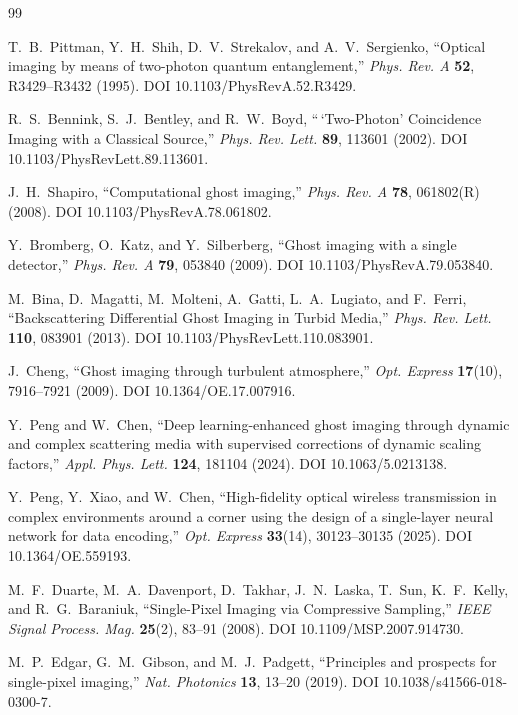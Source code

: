 \begin{thebibliography}{99}

T.~B.~Pittman, Y.~H.~Shih, D.~V.~Strekalov, and A.~V.~Sergienko, ``Optical imaging by means of two-photon quantum entanglement,'' \emph{Phys. Rev. A} \textbf{52}, R3429--R3432 (1995). DOI 10.1103/PhysRevA.52.R3429.

R.~S.~Bennink, S.~J.~Bentley, and R.~W.~Boyd, ``\,`Two-Photon' Coincidence Imaging with a Classical Source,'' \emph{Phys. Rev. Lett.} \textbf{89}, 113601 (2002). DOI 10.1103/PhysRevLett.89.113601.

J.~H.~Shapiro, ``Computational ghost imaging,'' \emph{Phys. Rev. A} \textbf{78}, 061802(R) (2008). DOI 10.1103/PhysRevA.78.061802.

Y.~Bromberg, O.~Katz, and Y.~Silberberg, ``Ghost imaging with a single detector,'' \emph{Phys. Rev. A} \textbf{79}, 053840 (2009). DOI 10.1103/PhysRevA.79.053840.

M.~Bina, D.~Magatti, M.~Molteni, A.~Gatti, L.~A.~Lugiato, and F.~Ferri, ``Backscattering Differential Ghost Imaging in Turbid Media,'' \emph{Phys. Rev. Lett.} \textbf{110}, 083901 (2013). DOI 10.1103/PhysRevLett.110.083901.

J.~Cheng, ``Ghost imaging through turbulent atmosphere,'' \emph{Opt. Express} \textbf{17}(10), 7916--7921 (2009). DOI 10.1364/OE.17.007916.

Y.~Peng and W.~Chen, ``Deep learning-enhanced ghost imaging through dynamic and complex scattering media with supervised corrections of dynamic scaling factors,'' \emph{Appl. Phys. Lett.} \textbf{124}, 181104 (2024). DOI 10.1063/5.0213138.

Y.~Peng, Y.~Xiao, and W.~Chen, ``High-fidelity optical wireless transmission in complex environments around a corner using the design of a single-layer neural network for data encoding,'' \emph{Opt. Express} \textbf{33}(14), 30123--30135 (2025). DOI 10.1364/OE.559193.

M.~F.~Duarte, M.~A.~Davenport, D.~Takhar, J.~N.~Laska, T.~Sun, K.~F.~Kelly, and R.~G.~Baraniuk, ``Single-Pixel Imaging via Compressive Sampling,'' \emph{IEEE Signal Process. Mag.} \textbf{25}(2), 83--91 (2008). DOI 10.1109/MSP.2007.914730.

M.~P.~Edgar, G.~M.~Gibson, and M.~J.~Padgett, ``Principles and prospects for single-pixel imaging,'' \emph{Nat. Photonics} \textbf{13}, 13--20 (2019). DOI 10.1038/s41566-018-0300-7.


\end{thebibliography}
